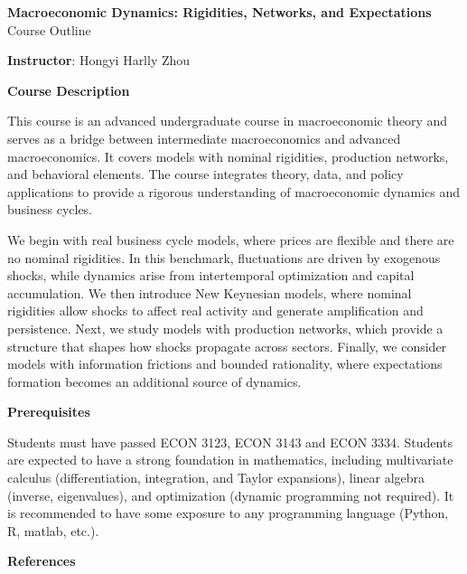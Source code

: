 \documentclass[12pt]{article}
\begin{document}
\begin{center}
    {\large \textbf{Macroeconomic Dynamics: Rigidities, Networks, and Expectations}\\
    \vspace{1em}
    Course Outline}
\end{center}


\vspace{1em}
\noindent \textbf{Instructor}: Hongyi Harlly Zhou

\vspace{2em}
\noindent \textbf{Course Description}

This course is an advanced undergraduate course in macroeconomic theory and serves as a bridge between intermediate macroeconomics and advanced macroeconomics. It covers models with nominal rigidities, production networks, and behavioral elements. The course integrates theory, data, and policy applications to provide a rigorous understanding of macroeconomic dynamics and business cycles.

We begin with real business cycle models, where prices are flexible and there are no nominal rigidities. In this benchmark, fluctuations are driven by exogenous shocks, while dynamics arise from intertemporal optimization and capital accumulation. We then introduce New Keynesian models, where nominal rigidities allow shocks to affect real activity and generate amplification and persistence. Next, we study models with production networks, which provide a structure that shapes how shocks propagate across sectors. Finally, we consider models with information frictions and bounded rationality, where expectations formation becomes an additional source of dynamics.



\vspace{2em}
\noindent \textbf{Prerequisites}

Students must have passed ECON 3123, ECON 3143 and ECON 3334. Students are expected to have a strong foundation in mathematics, including multivariate calculus (differentiation, integration, and Taylor expansions), linear algebra (inverse, eigenvalues), and optimization (dynamic programming not required). It is recommended to have some exposure to any programming language (Python, R, matlab, etc.).


\newpage
\noindent \textbf{References}
\end{document}
